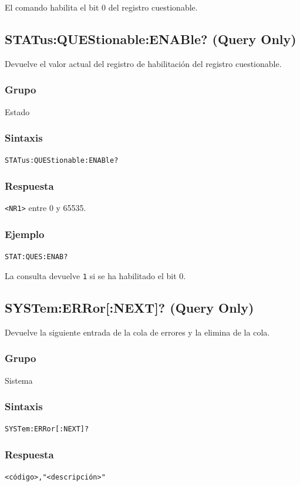 El comando habilita el bit 0 del registro cuestionable.

\subsection*{STATus:QUEStionable:ENABle? (Query Only)}

Devuelve el valor actual del registro de habilitación del registro
cuestionable.

\subsubsection*{Grupo}
Estado

\subsubsection*{Sintaxis}
\texttt{STATus:QUEStionable:ENABle?}

\subsubsection*{Respuesta}
\texttt{<NR1>} entre 0 y 65535.

\subsubsection*{Ejemplo}
\texttt{STAT:QUES:ENAB?}

La consulta devuelve \texttt{1} si se ha habilitado el bit 0.

\subsection*{SYSTem:ERRor[:NEXT]? (Query Only)}

Devuelve la siguiente entrada de la cola de errores y la elimina de la
cola.

\subsubsection*{Grupo}
Sistema

\subsubsection*{Sintaxis}
\texttt{SYSTem:ERRor[:NEXT]?}

\subsubsection*{Respuesta}
\texttt{<código>,"<descripción>"}

